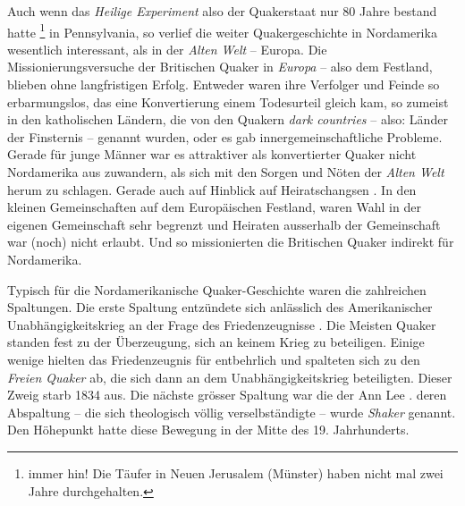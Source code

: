 \medskip

Auch wenn das \textit{Heilige Experiment} also der Quakerstaat nur 80 Jahre
bestand hatte \footnote{immer hin! Die Täufer in Neuen Jerusalem (Münster)   haben
nicht mal zwei Jahre durchgehalten.} in Pennsylvania, so verlief die weiter
Quakergeschichte in Nordamerika wesentlich interessant, als in der \textit{Alten
Welt} -- Europa. Die Missionierungsversuche  der Britischen Quaker in
\textit{Europa}  -- also dem Festland, blieben ohne langfristigen Erfolg.
Entweder waren ihre Verfolger  und Feinde so erbarmungslos, das eine
Konvertierung einem Todesurteil gleich kam, so zumeist in den katholischen 
Ländern, die von den Quakern \textit{dark countries}  -- also: Länder der
Finsternis -- genannt wurden, oder es gab innergemeinschaftliche Probleme.
Gerade
für junge Männer war es attraktiver als konvertierter Quaker nicht Nordamerika
aus zuwandern, als sich mit den Sorgen und Nöten der \textit{Alten Welt} herum
zu
schlagen. Gerade auch auf Hinblick auf Heiratschangsen . In den kleinen
Gemeinschaften auf dem Europäischen Festland, waren Wahl in der eigenen
Gemeinschaft sehr begrenzt und Heiraten ausserhalb der Gemeinschaft war (noch)
nicht erlaubt. Und so missionierten die Britischen Quaker indirekt für
Nordamerika.

\medskip

Typisch für die Nordamerikanische Quaker-Geschichte waren die zahlreichen
Spaltungen. Die erste Spaltung  entzündete sich anlässlich des Amerikanischer
Unabhängigkeitskrieg an der Frage des Friedenzeugnisse . Die Meisten Quaker
standen fest zu der Überzeugung, sich an keinem Krieg  zu beteiligen. Einige
wenige hielten das Friedenzeugnis für entbehrlich und spalteten sich zu den
\textit{Freien Quaker}   ab, die sich dann an dem Unabhängigkeitskrieg 
beteiligten. Dieser Zweig starb 1834 aus. Die nächste grösser Spaltung war die
der Ann Lee . deren Abspaltung -- die sich theologisch völlig verselbständigte --
wurde \textit{Shaker}  genannt. Den Höhepunkt hatte diese Bewegung in der Mitte
des 19. Jahrhunderts.

\medskip

